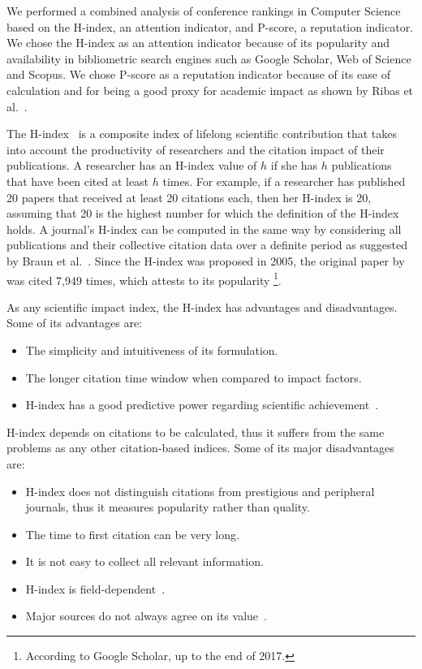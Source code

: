 \documentclass[notitlepage]{svjour3}
\begin{document}
We performed a combined analysis of conference rankings in Computer Science based on the H-index, an
attention indicator, and P-score, a reputation indicator. We chose the H-index as an attention 
indicator because of its popularity and availability in bibliometric search engines such as 
Google Scholar, Web of Science and Scopus. We chose P-score as a reputation indicator because 
of its ease of calculation and for being a good proxy for academic impact as shown by Ribas et 
al.~\cite{Ribas2015a}. 

The H-index~\cite{Hirsch2005} is a composite index of lifelong scientific contribution that takes 
into account the productivity of researchers and the citation impact of their publications.
A researcher has an H-index value of $ h $ if she has $ h $ publications that have been cited at 
least $ h $ times. For example, if a researcher has published 20 papers that received at least 20 
citations each, then her H-index is 20, assuming that 20 is the highest number for which the 
definition of the H-index holds. A journal's H-index can be computed 
in the same way by considering all publications and their collective citation data over a 
definite period as suggested by Braun et al.~\cite{Braun2006}.
Since the H-index was proposed in 2005, the original paper by~\cite{Hirsch2005} was 
cited 7,949 times, which attests to its popularity 
\footnote{According to Google Scholar, up to the end of 2017.}.

As any scientific impact index, the H-index has advantages and disadvantages. 
Some of its advantages are:

\begin{itemize}
\item The simplicity and intuitiveness of its formulation.
\item The longer citation time window when compared to impact factors.
\item H-index has a good predictive power regarding scientific achievement~\cite{Bornmann2005,Hirsch2007}.
\end{itemize}

H-index depends on citations to be calculated, thus it suffers from the 
same problems as any other citation-based indices. Some of its major disadvantages are:

\begin{itemize}
\item H-index does not distinguish citations from prestigious and peripheral journals, thus 
it measures popularity rather than quality.
\item The time to first citation can be very long.
\item It is not easy to collect all relevant information.
\item H-index is field-dependent~\cite{Wendl2007}.
\item Major sources do not always agree on its value~\cite{Bar-Ilan2008}. 
\end{itemize}
\end{document}
